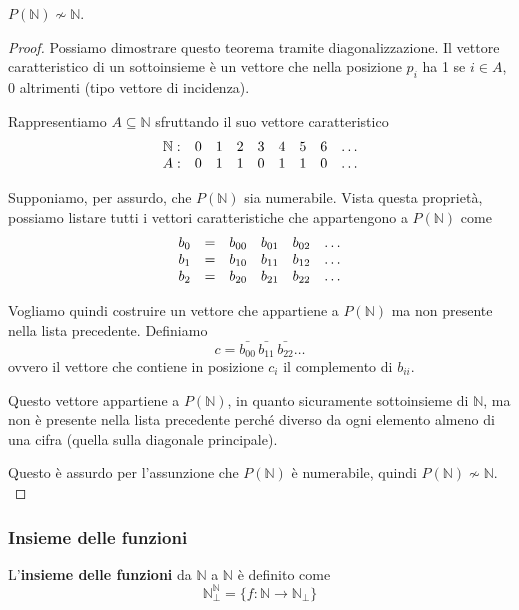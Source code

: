 \begin{theor}
	$P(\mathbb{N}) \nsim \mathbb{N}$.
\end{theor}
\begin{proof}
	Possiamo dimostrare questo teorema tramite diagonalizzazione. Il vettore caratteristico di un sottoinsieme è un vettore che nella posizione $p_i$ ha 1 se $i \in A$, 0 altrimenti (tipo vettore di incidenza).
	
	Rappresentiamo $A \subseteq \mathbb{N}$ sfruttando il suo vettore caratteristico
	$$ \begin{array}{c c c c c c c c c}
		\mathbb{N}: & 0 & 1 & 2 & 3 & 4 & 5 & 6 & \dots \\
		A: & 0 & 1 & 1 & 0 & 1 & 1 & 0 & \dots \\
	\end{array}$$
	
	Supponiamo, per assurdo, che $P (\mathbb{N})$ sia numerabile. Vista questa proprietà, possiamo listare tutti i vettori caratteristiche che appartengono a $P(\mathbb{N})$ come
	$$ 
	\begin{array}{c c c c c c}
		b_0 & = & b_{00} & b_{01} & b_{02} & \dots \\
		b_1 & = & b_{10} & b_{11} & b_{12} & \dots \\
		b_2 & = & b_{20} & b_{21} & b_{22} & \dots \\
	\end{array}
	$$
    
	Vogliamo quindi costruire un vettore che appartiene a $P(\mathbb{N})$ ma non presente nella lista precedente. Definiamo
	$$ c = \bar{b_{00}} \, \bar{b_{11}} \, \bar{b_{22}} \dots $$
	ovvero il vettore che contiene in posizione $c_i$ il complemento di $b_{ii}$.

	Questo vettore appartiene a $P(\mathbb{N})$, in quanto sicuramente sottoinsieme di $\mathbb{N}$, ma non è presente nella lista precedente perché diverso da ogni elemento almeno di una cifra (quella sulla diagonale principale). 
    
    Questo è assurdo per l'assunzione che $P(\mathbb{N})$ è numerabile, quindi $P(\mathbb{N}) \nsim \mathbb{N}$.\\
\end{proof}

\subsubsection{Insieme delle funzioni}

L'\textbf{insieme delle funzioni} da $\mathbb{N}$ a $\mathbb{N}$ è definito come
$$ \mathbb{N}^{\mathbb{N}}_\bot = \{f: \mathbb{N} \rightarrow \mathbb{N}_{\bot} \} $$

